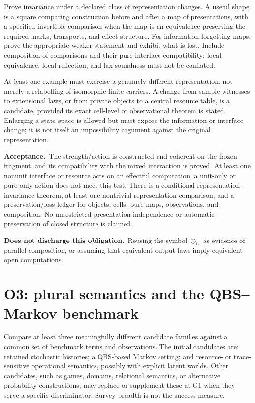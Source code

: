 \documentclass[11pt,a4paper]{article}
\newcommand{\accept}{\par\textbf{Acceptance.}\ }
\newcommand{\notaccepted}{\par\textbf{Does not discharge this obligation.}\ }
\begin{document}
Prove invariance under a declared class of representation changes. A useful
shape is a square comparing construction before and after a map of
presentations, with a specified invertible comparison when the map is an
equivalence preserving the required marks, transports, and effect structure.
For information-forgetting maps, prove the appropriate weaker statement and
exhibit what is lost. Include composition of comparisons and their
pure-interface compatibility; local equivalence, local reflection, and lax
soundness must not be conflated.

At least one example must exercise a genuinely different representation,
not merely a relabelling of isomorphic finite carriers. A change from sample
witnesses to extensional laws, or from private objects to a central resource
table, is a candidate, provided its exact cell-level or observational theorem
is stated. Enlarging a state space is allowed but must expose the information
or interface change; it is not itself an impossibility argument against the
original representation.

\accept The strength/action is constructed and coherent on the frozen
fragment, and its compatibility with the mixed interaction is proved.
At least one nonunit interface or resource acts on an effectful computation;
a unit-only or pure-only action does not meet this test.
There is a conditional representation-invariance theorem, at least one
nontrivial representation comparison, and a preservation/loss ledger for
objects, cells, pure maps, observations, and composition. No unrestricted
presentation independence or automatic preservation of closed structure is
claimed.

\notaccepted Reusing the symbol \(\odot_C\) as evidence of parallel
composition, or assuming that equivalent output laws imply equivalent open
computations.

\section{O3: plural semantics and the QBS--Markov benchmark}\label{sec:o3}

Compare at least three meaningfully different candidate families against a
common set of benchmark terms and observations. The initial candidates are:
retained stochastic histories; a QBS-based Markov setting; and resource- or
trace-sensitive operational semantics, possibly with explicit latent worlds.
Other candidates, such as games, domains, relational semantics, or alternative
probability constructions, may replace or supplement these at G1 when they
serve a specific discriminator. Survey breadth is not the success measure.
\end{document}
